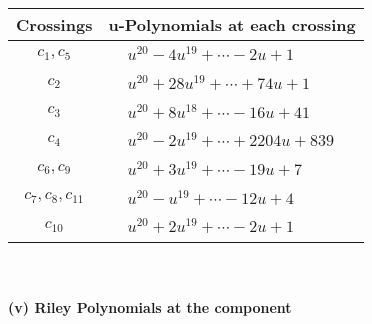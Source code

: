 \documentclass[1p]{elsarticle_modified}
\theoremstyle{definition}
\begin{document}
\begin{tabular}{m{50pt}|m{274pt}}
Crossings & \hspace{64pt}u-Polynomials at each crossing \\
\hline $$\begin{aligned}c_{1},c_{5}\end{aligned}$$&$\begin{aligned}
&u^{20}-4 u^{19}+\cdots-2 u+1
\end{aligned}$\\
\hline $$\begin{aligned}c_{2}\end{aligned}$$&$\begin{aligned}
&u^{20}+28 u^{19}+\cdots+74 u+1
\end{aligned}$\\
\hline $$\begin{aligned}c_{3}\end{aligned}$$&$\begin{aligned}
&u^{20}+8 u^{18}+\cdots-16 u+41
\end{aligned}$\\
\hline $$\begin{aligned}c_{4}\end{aligned}$$&$\begin{aligned}
&u^{20}-2 u^{19}+\cdots+2204 u+839
\end{aligned}$\\
\hline $$\begin{aligned}c_{6},c_{9}\end{aligned}$$&$\begin{aligned}
&u^{20}+3 u^{19}+\cdots-19 u+7
\end{aligned}$\\
\hline $$\begin{aligned}c_{7},c_{8},c_{11}\end{aligned}$$&$\begin{aligned}
&u^{20}- u^{19}+\cdots-12 u+4
\end{aligned}$\\
\hline $$\begin{aligned}c_{10}\end{aligned}$$&$\begin{aligned}
&u^{20}+2 u^{19}+\cdots-2 u+1
\end{aligned}$\\
\hline
\end{tabular}\\~\\
\newpage\renewcommand{\arraystretch}{1}
\flushleft \textbf{(v) Riley Polynomials at the component}\newline \\
\end{document}
